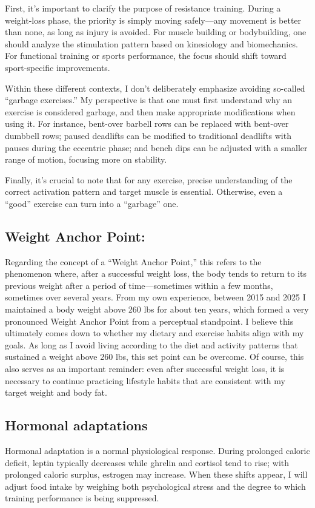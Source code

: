 First, it’s important to clarify the purpose of resistance training. During a weight-loss phase, the priority is simply moving safely—any movement is better than none, as long as injury is avoided. For muscle building or bodybuilding, one should analyze the stimulation pattern based on kinesiology and biomechanics. For functional training or sports performance, the focus should shift toward sport-specific improvements.

Within these different contexts, I don’t deliberately emphasize avoiding so-called “garbage exercises.” My perspective is that one must first understand why an exercise is considered garbage, and then make appropriate modifications when using it. For instance, bent-over barbell rows can be replaced with bent-over dumbbell rows; paused deadlifts can be modified to traditional deadlifts with pauses during the eccentric phase; and bench dips can be adjusted with a smaller range of motion, focusing more on stability.

Finally, it’s crucial to note that for any exercise, precise understanding of the correct activation pattern and target muscle is essential. Otherwise, even a “good” exercise can turn into a “garbage” one.

\subsection{Weight Anchor Point:}
Regarding the concept of a “Weight Anchor Point,” this refers to the phenomenon where, after a successful weight loss, the body tends to return to its previous weight after a period of time—sometimes within a few months, sometimes over several years. From my own experience, between 2015 and 2025 I maintained a body weight above 260 lbs for about ten years, which formed a very pronounced Weight Anchor Point from a perceptual standpoint. I believe this ultimately comes down to whether my dietary and exercise habits align with my goals. As long as I avoid living according to the diet and activity patterns that sustained a weight above 260 lbs, this set point can be overcome. Of course, this also serves as an important reminder: even after successful weight loss, it is necessary to continue practicing lifestyle habits that are consistent with my target weight and body fat.

\subsection{Hormonal adaptations}
Hormonal adaptation is a normal physiological response. During prolonged caloric deficit, leptin typically decreases while ghrelin and cortisol tend to rise; with prolonged caloric surplus, estrogen may increase. When these shifts appear, I will adjust food intake by weighing both psychological stress and the degree to which training performance is being suppressed. 

